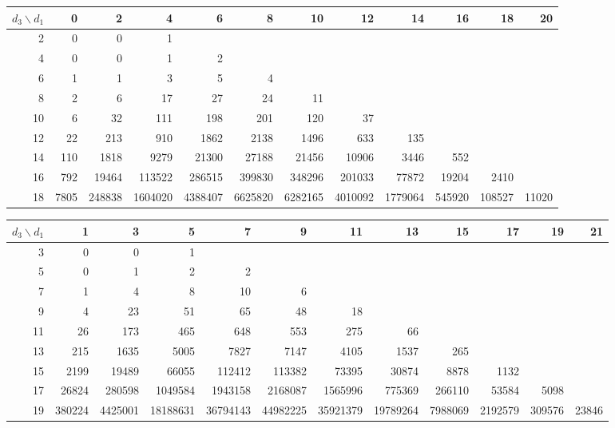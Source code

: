 \begin{tabular}{r|rrrrrrrrrrr}
\hline
$d_3 \backslash d_1$ & 0 & 2 & 4 & 6 & 8 & 10 & 12 & 14 & 16 & 18 & 20 \\
\hline
2 & 0 & 0 & 1 &  &  &  &  &  &  &  &  \\
4 & 0 & 0 & 1 & 2 &  &  &  &  &  &  &  \\
6 & 1 & 1 & 3 & 5 & 4 &  &  &  &  &  &  \\
8 & 2 & 6 & 17 & 27 & 24 & 11 &  &  &  &  &  \\
10 & 6 & 32 & 111 & 198 & 201 & 120 & 37 &  &  &  &  \\
12 & 22 & 213 & 910 & 1862 & 2138 & 1496 & 633 & 135 &  &  &  \\
14 & 110 & 1818 & 9279 & 21300 & 27188 & 21456 & 10906 & 3446 & 552 &  &  \\
16 & 792 & 19464 & 113522 & 286515 & 399830 & 348296 & 201033 & 77872 & 19204 & 2410 &  \\
18 & 7805 & 248838 & 1604020 & 4388407 & 6625820 & 6282165 & 4010092 & 1779064 & 545920 & 108527 & 11020 \\
\hline
\end{tabular}

\begin{tabular}{r|rrrrrrrrrrr}
\hline
$d_3 \backslash d_1$ & 1 & 3 & 5 & 7 & 9 & 11 & 13 & 15 & 17 & 19 & 21 \\
\hline
3 & 0 & 0 & 1 &  &  &  &  &  &  &  &  \\
5 & 0 & 1 & 2 & 2 &  &  &  &  &  &  &  \\
7 & 1 & 4 & 8 & 10 & 6 &  &  &  &  &  &  \\
9 & 4 & 23 & 51 & 65 & 48 & 18 &  &  &  &  &  \\
11 & 26 & 173 & 465 & 648 & 553 & 275 & 66 &  &  &  &  \\
13 & 215 & 1635 & 5005 & 7827 & 7147 & 4105 & 1537 & 265 &  &  &  \\
15 & 2199 & 19489 & 66055 & 112412 & 113382 & 73395 & 30874 & 8878 & 1132 &  &  \\
17 & 26824 & 280598 & 1049584 & 1943158 & 2168087 & 1565996 & 775369 & 266110 & 53584 & 5098 &  \\
19 & 380224 & 4425001 & 18188631 & 36794143 & 44982225 & 35921379 & 19789264 & 7988069 & 2192579 & 309576 & 23846 \\
\hline
\end{tabular}

